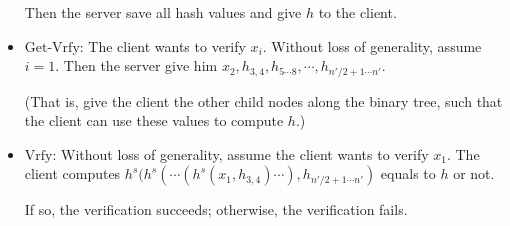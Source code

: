 \documentclass[a4paper]{article}
\newcommand{\Vrfy}{\text{Vrfy}}
\newcommand{\Getvrfy}{\text{Get-Vrfy}}
\newenvironment{problem}[2][Problem]{\begin{trivlist}
\item[\hskip \labelsep {\bfseries #1}\hskip \labelsep {\bfseries #2.}]}{\end{trivlist}}
\begin{document}
\begin{problem}{5.14}
\begin{itemize}
\begin{itemize}
    \end{itemize}
    Then the server save all hash values and give $h$ to the client.
    \item $\Getvrfy$: The client wants to verify $x_i$. Without loss of generality, assume $i=1$. Then the server give him $x_2, h_{3,4}, h_{5\cdots 8},\cdots, h_{n'/2+1\cdots n'}$.\par
    (That is, give the client the other child nodes along the binary tree, such that the client can use these values to compute $h$.)
    \item $\Vrfy$: Without loss of generality, assume the client wants to verify $x_1$. The client computes $h^s(h^s(\cdots(h^s(x_1,h_{3,4})\cdots),h_{n'/2+1\cdots n'})$ equals to $h$ or not.\par
    If so, the verification succeeds; otherwise, the verification fails.
\end{itemize}\par\vspace{3ex}


\end{problem}
\end{document}
